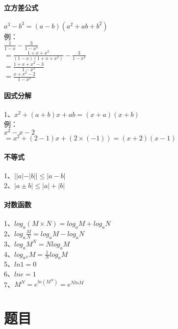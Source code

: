 \documentclass{article}
\begin{document}
\begin{flushleft}
	\paragraph{立方差公式}
	$a^3-b^3=(a-b)(a^2+ab+b^2)$\\
	例：\\
	\qquad $\frac{1}{1-x}-\frac{3}{1-x^3}$\\
	\qquad $=\frac{1+x+x^2}{(1-x)(1+x+x^2)}-\frac{3}{1-x^3}$\\
	\qquad $=\frac{1+x+x^2-3}{1-x^3}$\\
	\qquad $=\frac{x+x^2-2}{1-x^3}$\\
	
	\paragraph{因式分解}
	1、$x^2+(a+b)x+ab=(x+a)(x+b)$\\
	例：\\
	\qquad $x^2-x-2$\\
	\qquad $=x^2+(2-1)x+(2\times(-1))=(x+2)(x-1)$\\
	
	\paragraph{不等式}
	1、$||a|-|b||\le |a-b|$\\
	2、$|a\pm b|\le |a|+|b|$\\
	
	\paragraph{对数函数}
	1、$log_a(M\times N)=log_aM+log_aN$\\
	2、$log_a\frac{M}{N}=log_aM-log_aN$\\
	3、$log_aM^N=Nlog_aM$\\
	4、$log_{a^N}M=\frac{1}{N}log_aM$\\
	5、$ln1=0$\\
	6、$lne=1$\\
	7、$M^N=e^{ln(M^N)}=e^{NlnM}$\\
	
	
	\section{题目}
	

\end{flushleft}
\end{document}
